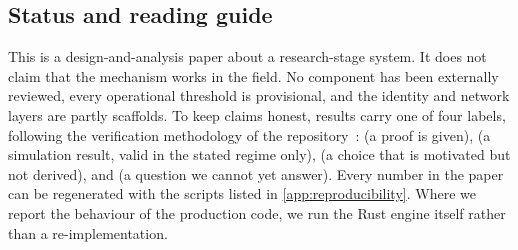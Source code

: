 \subsection{Status and reading guide}

This is a design-and-analysis paper about a research-stage system. It does not claim that the
mechanism works in the field. No component has been externally reviewed, every operational
threshold is provisional, and the identity and network layers are partly scaffolds. To keep
claims honest, results carry one of four labels, following the verification methodology of
the repository~\cite{isegoria-repo}:
\proved{} (a proof is given),
\empirical{} (a simulation result, valid in the stated regime only),
\designchoice{} (a choice that is motivated but not derived), and
\openq{} (a question we cannot yet answer).
Every number in the paper can be regenerated with the scripts listed in
\cref{app:reproducibility}. Where we report the behaviour of the production code, we run the
Rust engine itself rather than a re-implementation.
